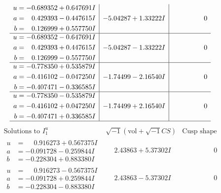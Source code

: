 \documentclass[1p]{elsarticle_modified}
\theoremstyle{definition}
\newcommand{\I}{\sqrt{-1}}
\begin{document}
$$\begin{array}{c|c|c}
\begin{aligned}
u &= -0.689352 + 0.647691 I \\
a &= \phantom{-}0.429393 - 0.447615 I \\
b &= \phantom{-}0.126999 + 0.557750 I\end{aligned}
 & -5.04287 + 1.33222 I & \phantom{-0.000000 } 0 \\ \hline\begin{aligned}
u &= -0.689352 - 0.647691 I \\
a &= \phantom{-}0.429393 + 0.447615 I \\
b &= \phantom{-}0.126999 - 0.557750 I\end{aligned}
 & -5.04287 - 1.33222 I & \phantom{-0.000000 } 0 \\ \hline\begin{aligned}
u &= -0.778350 + 0.535879 I \\
a &= -0.416102 - 0.047250 I \\
b &= -0.407471 - 0.336585 I\end{aligned}
 & -1.74499 - 2.16540 I & \phantom{-0.000000 } 0 \\ \hline\begin{aligned}
u &= -0.778350 - 0.535879 I \\
a &= -0.416102 + 0.047250 I \\
b &= -0.407471 + 0.336585 I\end{aligned}
 & -1.74499 + 2.16540 I & \phantom{-0.000000 } 0\\
 \hline 
 \end{array}$$\newpage$$\begin{array}{c|c|c}  
\text{Solutions to }I^u_{1}& \I (\text{vol} + \sqrt{-1}CS) & \text{Cusp shape}\\
 \hline 
\begin{aligned}
u &= \phantom{-}0.916273 + 0.567375 I \\
a &= -0.091728 - 0.259844 I \\
b &= -0.228304 + 0.883380 I\end{aligned}
 & \phantom{-}2.43863 + 5.37302 I & \phantom{-0.000000 } 0 \\ \hline\begin{aligned}
u &= \phantom{-}0.916273 - 0.567375 I \\
a &= -0.091728 + 0.259844 I \\
b &= -0.228304 - 0.883380 I\end{aligned}
 & \phantom{-}2.43863 - 5.37302 I & \phantom{-0.000000 } 0 \\ \hline\begin{aligned}

\end{aligned}
\end{array}$$
\end{document}
